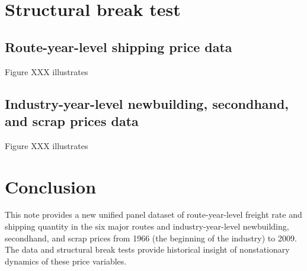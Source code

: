 \documentclass[11pt]{article}
\begin{document}

\section{Structural break test}

\subsection{Route-year-level shipping price data}

Figure XXX illustrates

\subsection{Industry-year-level newbuilding, secondhand, and scrap prices data}

Figure XXX illustrates


\section{Conclusion}
This note provides a new unified panel dataset of route-year-level freight rate and shipping quantity in the six major routes and industry-year-level newbuilding, secondhand, and scrap prices from 1966 (the beginning of the industry) to 2009. The data and structural break tests provide historical insight of nonstationary dynamics of these price variables.


\appendix

% 
% 


\newpage


\end{document}
